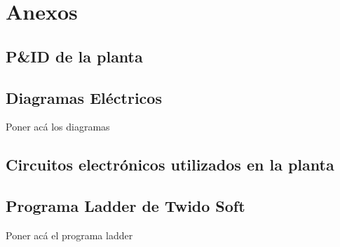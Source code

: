 \chapter{Anexos}
\label{ch:anexos}


\cleardoublepage
\section{P\&ID de la planta}
\label{anexo:pyid}
\section{Diagramas Eléctricos}
\label{anexo:diag}
Poner acá los diagramas

\section{Circuitos electrónicos utilizados en la planta}
\label{anexo:circuitos}




\section{Programa Ladder de Twido Soft}
\label{anexo:programaLadder}
Poner acá el programa ladder

